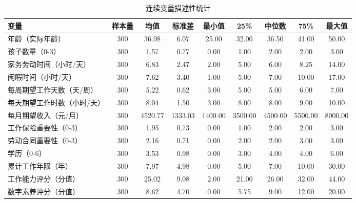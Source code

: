 
\begin{table}[htbp]
\centering
\caption{连续变量描述性统计}
\label{tab:descriptive_continuous}
\begin{tabular}{lcccccccc}
\toprule
变量 & 样本量 & 均值 & 标准差 & 最小值 & 25\% & 中位数 & 75\% & 最大值 \\
\midrule
年龄（实际年龄） & 300 & 36.98 & 6.07 & 25.00 & 32.00 & 36.50 & 41.00 & 50.00 \\
孩子数量（0-3） & 300 & 1.57 & 0.77 & 0.00 & 1.00 & 2.00 & 2.00 & 3.00 \\
家务劳动时间（小时/天） & 300 & 6.83 & 2.47 & 2.00 & 5.00 & 6.00 & 8.25 & 14.00 \\
闲暇时间（小时/天） & 300 & 7.62 & 3.40 & 1.00 & 5.00 & 7.00 & 10.00 & 17.00 \\
每周期望工作天数（天/周） & 300 & 5.22 & 0.62 & 3.00 & 5.00 & 5.00 & 6.00 & 7.00 \\
每天期望工作时数（小时/天） & 300 & 8.04 & 1.50 & 3.00 & 8.00 & 8.00 & 9.00 & 10.00 \\
每月期望收入（元/月） & 300 & 4520.77 & 1333.03 & 1400.00 & 3500.00 & 4500.00 & 5500.00 & 8000.00 \\
工作保险重要性（0-3） & 300 & 1.95 & 0.73 & 0.00 & 1.00 & 2.00 & 2.00 & 3.00 \\
劳动合同重要性（0-3） & 300 & 2.16 & 0.71 & 0.00 & 2.00 & 2.00 & 3.00 & 3.00 \\
学历（0-6） & 300 & 3.53 & 0.98 & 0.00 & 3.00 & 4.00 & 4.00 & 6.00 \\
累计工作年限（年） & 300 & 7.97 & 4.98 & 0.00 & 5.00 & 7.00 & 10.00 & 30.00 \\
工作能力评分（分值） & 300 & 25.02 & 9.08 & 2.00 & 21.00 & 26.00 & 32.00 & 44.00 \\
数字素养评分（分值） & 300 & 8.62 & 4.70 & 0.00 & 5.75 & 9.00 & 12.00 & 20.00 \\
\bottomrule
\end{tabular}
\end{table}


